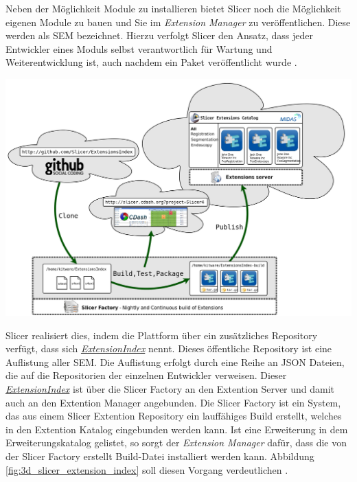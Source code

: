 \begin{minipage}{0.30\textwidth}
	Neben der Möglichkeit Module zu installieren bietet Slicer noch die Möglichkeit
	eigenen Module zu bauen und Sie im \textit{Extension Manager} zu
	veröffentlichen. Diese werden als \ac{SEM} bezeichnet. Hierzu verfolgt Slicer den
	Ansatz, dass jeder Entwickler eines Moduls selbst verantwortlich für Wartung
	und Weiterentwicklung ist, auch nachdem ein Paket veröffentlicht wurde \citep[vgl.][]{slicer2024}.
\end{minipage}
\hfill
\begin{minipage}{0.60\textwidth}
	\centering
	\includegraphics[width=1\textwidth]{img/slicer_extention_index.png}
	\label{fig:3d_slicer_extension_index}
\end{minipage}

Slicer realisiert dies, indem die Plattform über ein zusätzliches Repository
verfügt, dass sich \href{https://github.com/Slicer/ExtensionsIndex?tab=readme-ov-file}{\textit{ExtensionIndex}}
nennt. Dieses öffentliche Repository ist eine Auflistung aller \ac{SEM}. Die
Auflistung erfolgt durch eine Reihe an \ac{JSON} Dateien, die auf die
Repositorien der einzelnen Entwickler verweisen. Dieser \href{https://github.com/Slicer/ExtensionsIndex?tab=readme-ov-file}{\textit{ExtensionIndex}}
ist über die Slicer Factory an den Extention Server und damit auch an den Extention
Manager angebunden. Die Slicer Factory ist ein System, das aus einem Slicer Extention
Repository ein lauffähiges Build erstellt, welches in den Extention Katalog
eingebunden werden kann. Ist eine Erweiterung in dem Erweiterungskatalog gelistet,
so sorgt der \textit{Extension Manager} dafür, dass die von der Slicer Factory
erstellt Build-Datei installiert werden kann. Abbildung \ref{fig:3d_slicer_extension_index}
soll diesen Vorgang verdeutlichen \citep[vgl.][]{slicer2024}.

